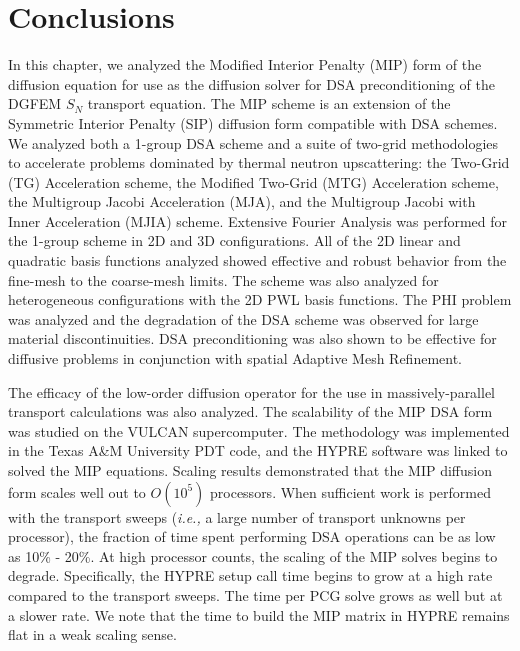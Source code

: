 \section{Conclusions}
\label{sec::DSA_Conclusions}

In this chapter, we analyzed the Modified Interior Penalty (MIP) form of the diffusion equation for use as the diffusion solver for DSA preconditioning of the DGFEM $S_N$ transport equation. The MIP scheme is an extension of the Symmetric Interior Penalty (SIP) diffusion form compatible with DSA schemes. We analyzed both a 1-group DSA scheme and a suite of two-grid methodologies to accelerate problems dominated by thermal neutron upscattering: the Two-Grid (TG) Acceleration scheme, the Modified Two-Grid (MTG) Acceleration scheme, the Multigroup Jacobi Acceleration (MJA), and the Multigroup Jacobi with Inner Acceleration (MJIA) scheme. Extensive Fourier Analysis was performed for the 1-group scheme in 2D and 3D configurations. All of the 2D linear and quadratic basis functions analyzed showed effective and robust behavior from the fine-mesh to the coarse-mesh limits. The scheme was also analyzed for heterogeneous configurations with the 2D PWL basis functions. The PHI problem was analyzed and the degradation of the DSA scheme was observed for large material discontinuities. DSA preconditioning was also shown to be effective for diffusive problems in conjunction with spatial Adaptive Mesh Refinement. 

The efficacy of the low-order diffusion operator for the use in massively-parallel transport calculations was also analyzed. The scalability of the MIP DSA form was studied on the VULCAN supercomputer. The methodology was implemented in the Texas A\&M University PDT code, and the HYPRE software was linked to solved the MIP equations. Scaling results demonstrated that the MIP diffusion form scales well out to $O(10^5)$ processors. When sufficient work is performed with the transport sweeps ({\em i.e.,} a large number of transport unknowns per processor), the fraction of time spent performing DSA operations can be as low as 10\% - 20\%. At high processor counts, the scaling of the MIP solves begins to degrade. Specifically, the HYPRE setup call time begins to grow at a high rate compared to the transport sweeps. The time per PCG solve grows as well but at a slower rate. We note that the time to build the MIP matrix in HYPRE remains flat in a weak scaling sense.

